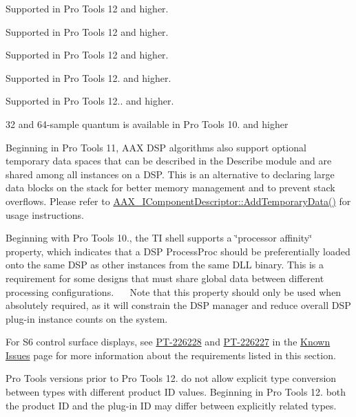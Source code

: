 \begin{DoxyRefList}
Supported in Pro Tools 12 and higher.

Supported in Pro Tools 12 and higher.

Supported in Pro Tools 12 and higher.

Supported in Pro Tools 12. and higher.

Supported in Pro Tools 12.. and higher. 
\item[\label{a00381__compatibility_notes000020}%
\hypertarget{a00381__compatibility_notes000020}{}%
Module \hyperlink{a00362}{A\+A\+X\+\_\+\+T\+I\+\_\+\+Guide} ]32 and 64-\/sample quantum is available in Pro Tools 10. and higher

Beginning in Pro Tools 11, A\+A\+X D\+S\+P algorithms also support optional temporary data spaces that can be described in the Describe module and are shared among all instances on a D\+S\+P. This is an alternative to declaring large data blocks on the stack for better memory management and to prevent stack overflows. Please refer to \hyperlink{a00088_ad8daad601b60fdbd6134fe0c8faa2fc4}{A\+A\+X\+\_\+\+I\+Component\+Descriptor\+::\+Add\+Temporary\+Data()} for usage instructions.

Beginning with Pro Tools 10., the T\+I shell supports a \char`\"{}processor affinity\char`\"{} property, which indicates that a D\+S\+P Process\+Proc should be preferentially loaded onto the same D\+S\+P as other instances from the same D\+L\+L binary. This is a requirement for some designs that must share global data between different processing configurations.~\newline
 ~\newline
 Note that this property should only be used when absolutely required, as it will constrain the D\+S\+P manager and reduce overall D\+S\+P plug-\/in instance counts on the system. 
\item[\label{a00381__compatibility_notes000001}%
\hypertarget{a00381__compatibility_notes000001}{}%
Module \hyperlink{a00342}{Additional\+Features\+\_\+\+Curve\+Displays} ]For S6 control surface displays, see \hyperlink{a00374_PT-226228}{P\+T-\/226228} and \hyperlink{a00374_PT-226227}{P\+T-\/226227} in the \hyperlink{a00374}{Known Issues} page for more information about the requirements listed in this section. 
\item[\label{a00381__compatibility_notes000007}%
\hypertarget{a00381__compatibility_notes000007}{}%
Module \hyperlink{a00356}{advanced\+Topics\+\_\+related\+Types} ]Pro Tools versions prior to Pro Tools 12. do not allow explicit type conversion between types with different product I\+D values. Beginning in Pro Tools 12. both the product I\+D and the plug-\/in I\+D may differ between explicitly related types.


\end{DoxyRefList}
